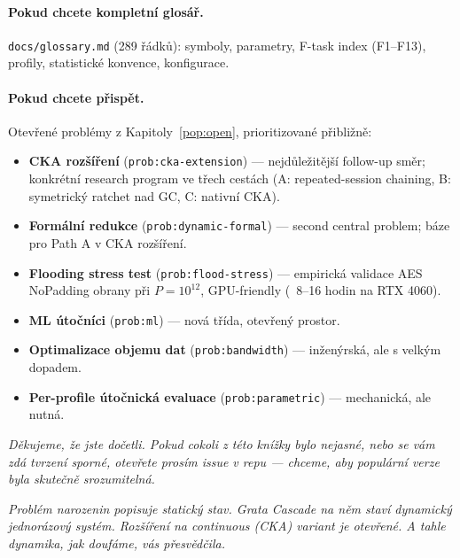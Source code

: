\documentclass[11pt,a4paper]{article}
\begin{document}
\paragraph{Pokud chcete kompletní glosář.} \texttt{docs/glossary.md} (289 řádků): symboly, parametry, F-task index (F1--F13), profily, statistické konvence, konfigurace.

\paragraph{Pokud chcete přispět.} Otevřené problémy z Kapitoly~\ref{pop:open}, prioritizované přibližně:
\begin{itemize}[leftmargin=*]
\item \textbf{CKA rozšíření} (\texttt{prob:cka-extension}) --- nejdůležitější follow-up směr; konkrétní research program ve třech cestách (A: repeated-session chaining, B: symetrický ratchet nad GC, C: nativní CKA).
\item \textbf{Formální redukce} (\texttt{prob:dynamic-formal}) --- second central problem; báze pro Path A v CKA rozšíření.
\item \textbf{Flooding stress test} (\texttt{prob:flood-stress}) --- empirická validace AES NoPadding obrany při $P = 10^{12}$, GPU-friendly (~8--16 hodin na RTX 4060).
\item \textbf{ML útočníci} (\texttt{prob:ml}) --- nová třída, otevřený prostor.
\item \textbf{Optimalizace objemu dat} (\texttt{prob:bandwidth}) --- inženýrská, ale s velkým dopadem.
\item \textbf{Per-profile útočnická evaluace} (\texttt{prob:parametric}) --- mechanická, ale nutná.
\end{itemize}

\bigskip

\noindent\textit{Děkujeme, že jste dočetli. Pokud cokoli z této knížky bylo nejasné, nebo se vám zdá tvrzení sporné, otevřete prosím issue v repu --- chceme, aby populární verze byla skutečně srozumitelná.}

\medskip
\noindent\emph{Problém narozenin popisuje statický stav. Grata Cascade na něm staví dynamický jednorázový systém. Rozšíření na continuous (CKA) variant je otevřené. A tahle dynamika, jak doufáme, vás přesvědčila.}
\end{document}
